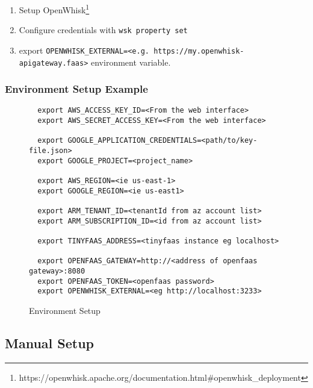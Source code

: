 \documentclass[../main.tex]{subfiles}
\begin{document}
\begin{enumerate}
\item Setup OpenWhisk\footnote{https://openwhisk.apache.org/documentation.html\#openwhisk\_deployment}
\item Configure credentials with \texttt{wsk property set}
\item export \texttt{OPENWHISK\_EXTERNAL=<e.g. https://my.openwhisk-apigateway.faas>} environment variable.
\end{enumerate}

\subsubsection{Environment Setup Example}\label{sec:providersetupenv}


\begin{figure}[H]
\begin{tcolorbox}
\begin{verbatim}
  export AWS_ACCESS_KEY_ID=<From the web interface>
  export AWS_SECRET_ACCESS_KEY=<From the web interface>

  export GOOGLE_APPLICATION_CREDENTIALS=<path/to/key-file.json>
  export GOOGLE_PROJECT=<project_name>

  export AWS_REGION=<ie us-east-1>
  export GOOGLE_REGION=<ie us-east1>

  export ARM_TENANT_ID=<tenantId from az account list>
  export ARM_SUBSCRIPTION_ID=<id from az account list>

  export TINYFAAS_ADDRESS=<tinyfaas instance eg localhost>

  export OPENFAAS_GATEWAY=http://<address of openfaas gateway>:8080
  export OPENFAAS_TOKEN=<openfaas password>
  export OPENWHISK_EXTERNAL=<eg http://localhost:3233>
\end{verbatim}
\end{tcolorbox}
\caption{Environment Setup}%
\label{fig:envSetup}
\end{figure}


\subsection{Manual Setup}\label{sec:manualsetup}
\end{document}

